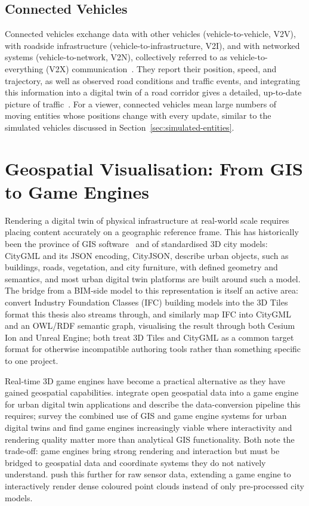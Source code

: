 \subsection{Connected Vehicles}

Connected vehicles exchange data with other vehicles (vehicle-to-vehicle, V2V), with roadside infrastructure (vehicle-to-infrastructure, V2I), and with networked systems (vehicle-to-network, V2N), collectively referred to as vehicle-to-everything (V2X) communication~\cite{abboud2016v2x}. They report their position, speed, and trajectory, as well as observed road conditions and traffic events, and integrating this information into a digital twin of a road corridor gives a detailed, up-to-date picture of traffic~\cite{wu2025v2xdigitaltwin}. For a viewer, connected vehicles mean large numbers of moving entities whose positions change with every update, similar to the simulated vehicles discussed in Section~\ref{sec:simulated-entities}.

\section{Geospatial Visualisation: From GIS to Game Engines}
\label{sec:geospatial-vis}

Rendering a digital twin of physical infrastructure at real-world scale requires placing content accurately on a geographic reference frame. This has historically been the province of GIS software~\cite{goodchild2010giscience} and of standardised 3D city models: CityGML and its JSON encoding, CityJSON, describe urban objects, such as buildings, roads, vegetation, and city furniture, with defined geometry and semantics, and most urban digital twin platforms are built around such a model. The bridge from a BIM-side model to this representation is itself an active area: \textcite{xu2019ifc3dtiles} convert Industry Foundation Classes (IFC) building models into the 3D Tiles format this thesis also streams through, and \textcite{lam2024digitaltwinsmartcity} similarly map IFC into CityGML and an OWL/RDF semantic graph, visualising the result through both Cesium Ion and Unreal Engine; both treat 3D Tiles and CityGML as a common target format for otherwise incompatible authoring tools rather than something specific to one project.

Real-time 3D game engines have become a practical alternative as they have gained geospatial capabilities. \textcite{rantanen2023opengeospatial} integrate open geospatial data into a game engine for urban digital twin applications and describe the data-conversion pipeline this requires; \textcite{ene2026urbandigitaltwins} survey the combined use of GIS and game engine systems for urban digital twins and find game engines increasingly viable where interactivity and rendering quality matter more than analytical GIS functionality. Both note the trade-off: game engines bring strong rendering and interaction but must be bridged to geospatial data and coordinate systems they do not natively understand. \textcite{virtanen2020pointclouds} push this further for raw sensor data, extending a game engine to interactively render dense coloured point clouds instead of only pre-processed city models.

